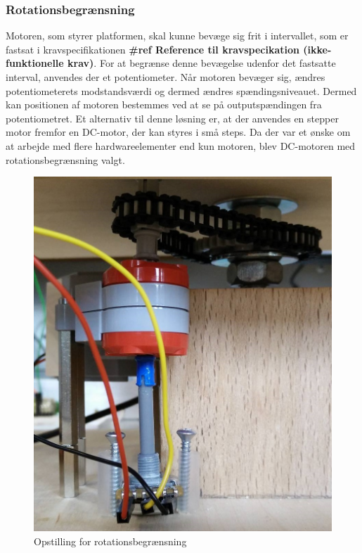 \subsubsection{Rotationsbegrænsning}
Motoren, som styrer platformen, skal kunne bevæge sig frit i intervallet, som er fastsat i kravspecifikationen \textbf{\#ref Reference til kravspecikation (ikke-funktionelle krav)}. For at begrænse denne bevægelse udenfor det fastsatte interval, anvendes der et potentiometer. Når motoren bevæger sig, ændres potentiometerets modstandsværdi og dermed ændres spændingsniveauet. Dermed kan positionen af motoren bestemmes ved at se på outputspændingen fra potentiometret. Et alternativ til denne løsning er, at der anvendes en stepper motor fremfor en DC-motor, der kan styres i små steps. Da der var et ønske om at arbejde med flere hardwareelementer end kun motoren, blev DC-motoren med rotationsbegrænsning valgt.

\begin{figure}[H]
	\centering
	\includegraphics[scale=0.3]{Afsnit/DesignOgImplementering/images/potentiometerADC}
	\caption{Opstilling for rotationsbegrænsning}
	\label{fig:opstillingADC}
\end{figure}

